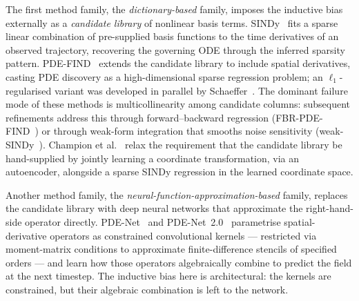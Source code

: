 \documentclass[10pt,journal,compsoc]{IEEEtran}
\begin{document}
The first method family, the \emph{dictionary-based} family,
imposes the inductive bias externally as a \emph{candidate
library} of nonlinear basis terms.
SINDy~\cite{brunton2016} fits a sparse linear combination of
pre-supplied basis functions to the time derivatives of an
observed trajectory, recovering the governing ODE through the
inferred sparsity pattern. PDE-FIND~\cite{rudy2017} extends
the candidate library to include spatial derivatives, casting PDE
discovery as a high-dimensional sparse regression problem; an
$\ell_1$-regularised variant was developed in
parallel by Schaeffer~\cite{schaeffer2017}. The dominant
failure mode of these methods is multicollinearity among
candidate columns: subsequent refinements address this through
forward--backward regression
(FBR-PDE-FIND~\cite{lu2024}) or through weak-form
integration that smooths noise sensitivity
(weak-SINDy~\cite{messenger2021}). Champion et
al.~\cite{champion2019} relax the requirement that the
candidate library be hand-supplied by jointly learning a
coordinate transformation, via an autoencoder, alongside a sparse
SINDy regression in the learned coordinate space.

Another method family, the
\emph{neural-function-approximation-based} family, replaces the
candidate library with deep neural networks that approximate the
right-hand-side operator directly.
PDE-Net~\cite{long2018} and PDE-Net~2.0~\cite{long2019}
parametrise spatial-derivative operators as constrained
convolutional kernels --- restricted via moment-matrix conditions
to approximate finite-difference stencils of specified orders ---
and learn how those operators algebraically combine to predict
the field at the next timestep. The inductive bias here is
architectural: the kernels are constrained, but their algebraic
combination is left to the network.
\end{document}
